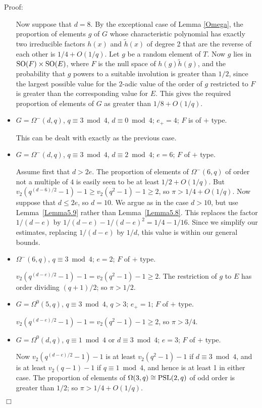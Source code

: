 \documentclass[12pt]{article}
\newenvironment{proof}{\normalsize {\sc Proof}:}{{\hfill $\Box$ \\}}
\def\SO{{\rm SO}}
\def\Oh{O}  %
\def\PSL{{\rm PSL}}
\begin{document}
\begin{proof}
\begin{itemize}
Now suppose that $d=8$. By the exceptional case of 
Lemma \ref{Omega}, the proportion of elements $g$ 
of $G$ whose characteristic polynomial
has exactly two irreducible factors $h(x)$ and $\tilde{h}(x)$ of 
degree 2 that are the reverse of each other is $1/4+\Oh(1/q)$.
Let $g$ be a random element of $T$.  
Now $g$ lies in $\SO(F)\times\SO(E)$, where $F$ is the null space 
of $h(g)\tilde{h}(g)$, and the probability that $g$ powers to a
suitable involution is greater than $1/2$, since the largest possible value 
for the $2$-adic value of the order of $g$ restricted to $F$ is
greater than the corresponding value  for $E$.  This gives the 
required proportion of elements of $G$ as greater than $1/8+\Oh(1/q)$.

\item 
$G=\Omega^-(d,q)$, $q\equiv3\bmod4$, $d\equiv0\bmod4$; $e_{+}=4$; 
$F$ is of $+$ type.

This can be dealt with exactly as the previous case.

\item 
$G=\Omega^-(d,q)$, $q\equiv3\bmod4$, $d\equiv2\bmod4$; $e=6$; 
$F$ of $+$ type. 

Assume first that $d>2e$.
The proportion of elements of $\Omega^-(6,q)$ of order not a multiple 
of $4$ is easily seen to be at least $1/2+\Oh(1/q)$.
But $v_2(q^{(d-6)/2}-1)-1\ge v_2(q^2-1)-1\ge2$, so $\pi>1/4+\Oh(1/q)$.
Now suppose that $d\le2e$, so $d=10$.  We argue 
as in the case $d>10$, but use Lemma~\ref{Lemma5.9} rather than
Lemma~\ref{Lemma5.8}.  This replaces the factor $1/(d-e)$ by 
$1/(d-e)-1/(d-e)^2=1/4-1/16$.  
Since we simplify our estimates, replacing $1/(d-e)$ by $1/d$, this 
value is within our general bounds.

\item 
$\Omega^-(6,q)$, $q\equiv3\bmod4$; $e=2$; $F$ of $+$ type.

$v_2(q^{(d-e)/2}-1)-1=v_2(q^2-1)-1\ge2$.  The restriction of $g$ to
$E$ has order dividing $(q+1)/2$; so $\pi>1/2$.

\item 
$G=\Omega^0(5,q)$, $q\equiv3\bmod4$, $q>3$; $e_+=1$; $F$ of $+$ type.

$v_2(q^{(d-e)/2}-1)-1=v_2(q^2-1)-1\ge2$, so $\pi>3/4$.
\item 
$G=\Omega^0(d,q)$, $q\equiv1\bmod4$ or $d\equiv3\bmod4$; 
$e=3$; $F$ of $+$ type.

Now $v_2(q^{(d-e)/2}-1)-1$ is at least $v_2(q^2-1)-1$ if $d\equiv3\bmod4$,
and is at least $v_2(q-1)-1$ if $q\equiv1\bmod4$, and hence is at least 1 in
either case.  The proportion of elements of $\Omega(3,q)\cong\PSL(2,q)$ of
odd order is greater than $1/2$; so $\pi>1/4+\Oh(1/q)$.


\end{itemize}
\end{proof}
\end{document}
